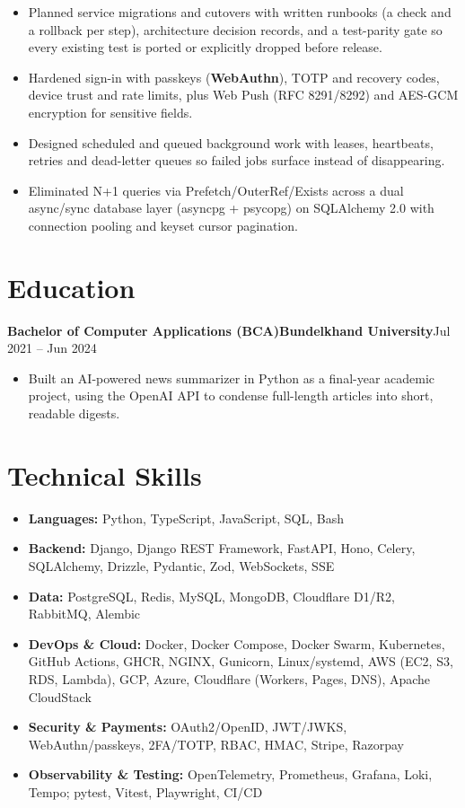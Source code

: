 \documentclass[11pt,a4paper]{article}
\newcommand{\entry}[3]{%
  \vspace{4.5pt}\noindent\textbf{#1}\hfill\textbf{#2}\hfill{\color{subtlegray}#3}\par\vspace{2pt}}
\begin{document}
\begin{itemize}
        (\textbf{httpx}, \textbf{Pydantic v2}, mypy-strict), published to PyPI ---
        \href{https://github.com/alzywelzy/namecheap-wrapper}{github.com/alzywelzy/namecheap-wrapper}.
  \item Planned service migrations and cutovers with written runbooks (a check
        and a rollback per step), architecture decision records, and a test-parity
        gate so every existing test is ported or explicitly dropped before release.
  \item Hardened sign-in with passkeys (\textbf{WebAuthn}), TOTP and
        recovery codes, device trust and rate limits, plus Web Push (RFC
        8291/8292) and AES-GCM encryption for sensitive fields.
  \item Designed scheduled and queued background work with leases,
        heartbeats, retries and dead-letter queues so failed jobs surface
        instead of disappearing.
  \item Eliminated N+1 queries via Prefetch/OuterRef/Exists across a dual
        async/sync database layer (asyncpg + psycopg) on SQLAlchemy 2.0 with
        connection pooling and keyset cursor pagination.
\end{itemize}

\section{Education}
\entry{Bachelor of Computer Applications (BCA)}{Bundelkhand University}{Jul 2021 -- Jun 2024}
\begin{itemize}
  \item Built an AI-powered news summarizer in Python as a final-year academic
        project, using the OpenAI API to condense full-length articles into short,
        readable digests.
\end{itemize}

\section{Technical Skills}
\begin{itemize}
  \item \textbf{Languages:} Python, TypeScript, JavaScript, SQL, Bash
  \item \textbf{Backend:} Django, Django REST Framework, FastAPI, Hono, Celery, SQLAlchemy, Drizzle, Pydantic, Zod, WebSockets, SSE
  \item \textbf{Data:} PostgreSQL, Redis, MySQL, MongoDB, Cloudflare D1/R2, RabbitMQ, Alembic
  \item \textbf{DevOps \& Cloud:} Docker, Docker Compose, Docker Swarm, Kubernetes, GitHub Actions, GHCR, NGINX, Gunicorn, Linux/systemd, AWS (EC2, S3, RDS, Lambda), GCP, Azure, Cloudflare (Workers, Pages, DNS), Apache CloudStack
  \item \textbf{Security \& Payments:} OAuth2/OpenID, JWT/JWKS, WebAuthn/passkeys, 2FA/TOTP, RBAC, HMAC, Stripe, Razorpay
  \item \textbf{Observability \& Testing:} OpenTelemetry, Prometheus, Grafana, Loki, Tempo; pytest, Vitest, Playwright, CI/CD
\end{itemize}
\end{document}
